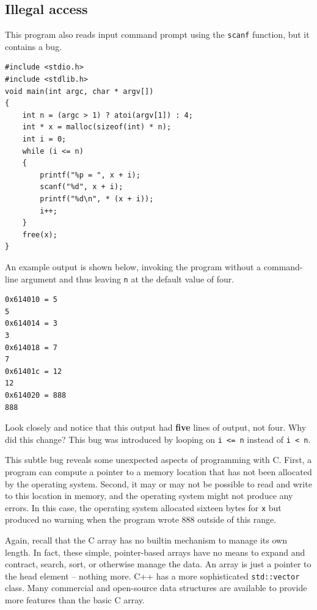 \documentclass{book}
\begin{document}
\subsection{Illegal access}

This program also reads input command prompt using the \texttt{scanf} function, but it contains a bug.

\begin{lstlisting}[caption={todo}, captionpos=b, mathescape, xleftmargin=.25in, xrightmargin=.25in]
#include <stdio.h>
#include <stdlib.h>
void main(int argc, char * argv[])
{
    int n = (argc > 1) ? atoi(argv[1]) : 4;
    int * x = malloc(sizeof(int) * n);
    int i = 0;
    while (i <= n)
    {
        printf("%p = ", x + i);
        scanf("%d", x + i);
        printf("%d\n", * (x + i));
        i++;
    }
    free(x);
}
\end{lstlisting}

An example output is shown below, invoking the program without a command-line argument and thus leaving \texttt{n} at the default value of four.

\begin{lstlisting}[caption={todo}, captionpos=b, mathescape, xleftmargin=.25in, xrightmargin=.25in]
0x614010 = 5                           
5      
0x614014 = 3                           
3
0x614018 = 7                           
7
0x61401c = 12                           
12
0x614020 = 888
888
\end{lstlisting}

Look closely and notice that this output had \textbf{five} lines of output, not four. Why did this change? This bug was introduced by looping on \texttt{i <= n} instead of \texttt{i < n}.

This subtle bug reveals some unexpected aspects of programming with C. First, a program can compute a pointer to a memory location that has not been allocated by the operating system. Second, it may or may not be possible to read and write to this location in memory, and the operating system might not produce any errors. In this case, the operating system allocated sixteen bytes for \texttt{x} but produced no warning when the program wrote 888 outside of this range.

Again, recall that the C array has no builtin mechanism to manage its own length. In fact, these simple, pointer-based arrays have no means to expand and contract, search, sort, or otherwise manage the data. An array is just a pointer to the head element -- nothing more. C++ has a more sophisticated \texttt{std::vector} class. Many commercial and open-source data structures are available to provide more features than the basic C array.
\end{document}
